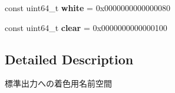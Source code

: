 \begin{DoxyCompactItemize}
\item 
\mbox{\label{namespace_g_a_1_1color_a6e43291dbd13c3850c9c170b5c4f2adf}} 
const uint64\+\_\+t {\bfseries white} = 0x00\textquotesingle{}00\textquotesingle{}00\textquotesingle{}00\textquotesingle{}00\textquotesingle{}00\textquotesingle{}00\textquotesingle{}80
\item 
\mbox{\label{namespace_g_a_1_1color_aad6ec9e2efdea8fd6b30909e4bffd4cc}} 
const uint64\+\_\+t {\bfseries clear} = 0x00\textquotesingle{}00\textquotesingle{}00\textquotesingle{}00\textquotesingle{}00\textquotesingle{}00\textquotesingle{}01\textquotesingle{}00
\end{DoxyCompactItemize}


\subsection{Detailed Description}
標準出力への着色用名前空間 

